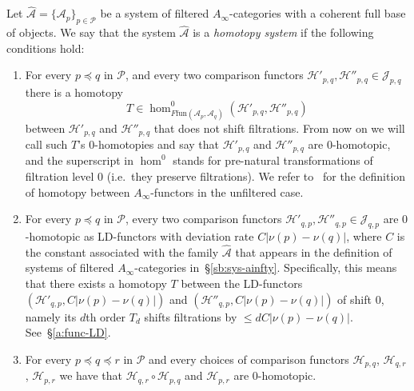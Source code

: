 Let $\widehat{\mathcal{A}} = \{\mathcal{A}_p\}_{p \in \mathcal{P}}$ be
a system of filtered $A_{\infty}$-categories with a coherent full base
of objects. We say that the system $\widehat{\mathcal{A}}$ is a {\em
  homotopy system} if the following conditions hold:
\begin{enumerate}
\item For every $p \preceq q$ in $\mathcal{P}$, and every two
  comparison functors
  $\mathcal{H}'_{p,q}, \mathcal{H}''_{p,q} \in \mathcal{J}_{p,q}$
  there is a homotopy
  $$T \in \hom_{F \text{fun}(\mathcal{A}_p,
    \mathcal{A}_q)}^0(\mathcal{H}'_{p,q}, \mathcal{H}''_{p,q})$$
  between $\mathcal{H}'_{p,q}$ and $\mathcal{H}''_{p,q}$ that does not
  shift filtrations. From now on we will call such $T$'s
  $0$-homotopies and say that $\mathcal{H}'_{p,q}$ and
  $\mathcal{H}''_{p,q}$ are $0$-homotopic, and the superscript in
  $\hom^0$ stands for pre-natural transformations of filtration level
  $0$ (i.e.~they preserve filtrations). We refer
  to~\cite[Section~(1h)]{Se:book-fukaya-categ} for the definition of
  homotopy between $A_{\infty}$-functors in the unfiltered case.
\item For every $p \preceq q$ in $\mathcal{P}$,  every two
  comparison functors
  $\mathcal{H}'_{q,p}, \mathcal{H}''_{q,p} \in \mathcal{J}_{q,p}$ are
  $0$-homotopic as LD-functors with deviation rate
  $C|\nu(p) - \nu(q)|$, where $C$ is the constant associated with the
  family $\widehat{\mathcal{A}}$ that appears in the definition of
  systems of filtered $A_{\infty}$-categories
  in~\S\ref{sb:sys-ainfty}. Specifically, this means that there exists
  a homotopy $T$ between the LD-functors
  $(\mathcal{H}'_{q,p}, C|\nu(p) - \nu(q)|)$ and
  $(\mathcal{H}''_{q,p}, C|\nu(p) - \nu(q)|)$ of shift $0$, namely its
  $d$th order $T_d$ shifts filtrations by $\leq d C|\nu(p) -
  \nu(q)|$. See~\S\ref{a:func-LD}.
\item For every $p \preceq q \preceq r$ in $\mathcal{P}$ and every
  choices of comparison functors $\mathcal{H}_{p,q}$,
  $\mathcal{H}_{q,r}$, $\mathcal{H}_{p,r}$ we have that
  $\mathcal{H}_{q,r} \circ \mathcal{H}_{p,q}$ and $\mathcal{H}_{p,r}$
  are $0$-homotopic.
\end{enumerate}

